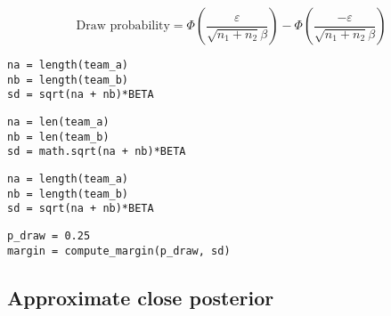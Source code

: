 \documentclass[article]{jss}
\newif\ifen
\newcommand{\en}[1]{\ifen#1\fi}
\begin{document}
\en{En todo caso, suponiendo que podemos definir de la ``probabilidad de empate'' para equipos de misma habilidad, es importante tener en cuenta que el margen $\varepsilon$ igualmente depende de la cantidad de jugadores.}
%
\en{Para mantener el área de empates constante, es necesario adaptar el margen}
%
\en{Esto es así porque la distribuci\'on de diferencias de rendimientos depende de cuántos jugadores hay en la partida.}
%
\en{Hay que tener en cuenta además que los resultado observados es independiente de nuestras creencias, por lo que la \'unica fuente de varianza en la diferencia de rendimiento proviene de los $\beta$.}
%
\en{Así es que podemos calcular el margen a partir de la ``probabilidades de empate''.}
%
\begin{equation}
 \text{Draw probability} = \Phi(\frac{\varepsilon}{\sqrt{n_1+n_2}\beta}) - \Phi(\frac{-\varepsilon}{\sqrt{n_1+n_2}\beta})
\end{equation}
%
\begin{paracol}{3}
\begin{lstlisting}[backgroundcolor=\color{julia},belowskip=-0.77 \baselineskip]
na = length(team_a)
nb = length(team_b)
sd = sqrt(na + nb)*BETA
\end{lstlisting}
\switchcolumn
\begin{lstlisting}[backgroundcolor=\color{python},belowskip=-0.77 \baselineskip]
na = len(team_a)
nb = len(team_b)
sd = math.sqrt(na + nb)*BETA
\end{lstlisting}
\switchcolumn
\begin{lstlisting}[backgroundcolor=\color{r},belowskip=-0.77 \baselineskip]
na = length(team_a)
nb = length(team_b)
sd = sqrt(na + nb)*BETA
\end{lstlisting}
\end{paracol}
\begin{lstlisting}[backgroundcolor=\color{all}]
p_draw = 0.25
margin = compute_margin(p_draw, sd)
\end{lstlisting}  

\subsection{Approximate close posterior} \label{sec:analytical_posterior}

\en{En la sección~\ref{sec:} hemos visto como encontrar la solución analítica de un posterior.}
%
\en{A pesar de que gráficamente (figura~\ref{fig:posterior_win}) se parezca a una Gasussiana, su expresión matemática (eq~\ref{eq:posterior_win}) no lo es.}
%
\en{Hubiera sido ideal obtener un solución exacta Gaussiana, porque eso nos hubiera garantizado que en el tiempo las estimaciones sucesivas serían a su vez Gaussianas.}
%
\en{Igualmente, dado que la forma exacta se parece a una Gaussiana, usar una Gaussiana para representar el posterior no parecería ser tan grave en términos de aproximación y en cambio nos permitiría realizar estimaciones sucesivas.}
\end{document}
